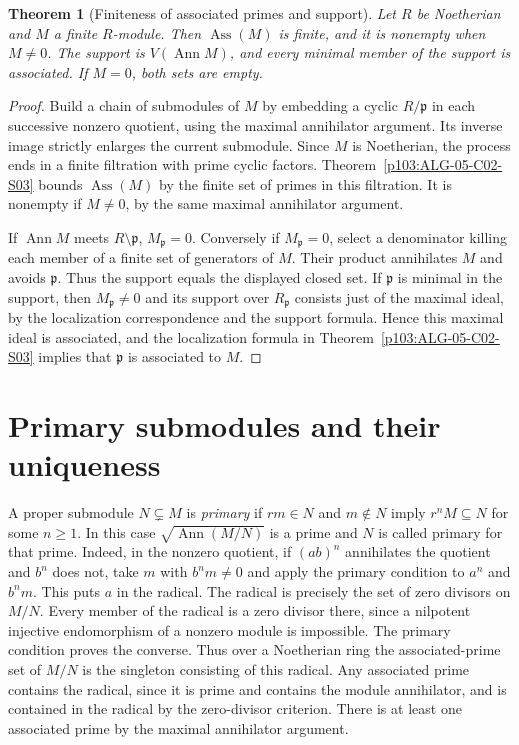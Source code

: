 \documentclass[11pt,oneside,openany]{book}
\newtheorem{theorem}{Theorem}[chapter]
\theoremstyle{definition}
\theoremstyle{remark}
\begin{document}
\begin{theorem}[Finiteness of associated primes and support]\label{p103:ALG-05-C02-R03}
Let \(R\) be Noetherian and \(M\) a finite \(R\)-module. Then \(\operatorname{Ass}(M)\) is finite, and it is nonempty when \(M\ne0\). The support is \(V(\operatorname{Ann}M)\), and every minimal member of the support is associated. If \(M=0\), both sets are empty.
\end{theorem}
\begin{proof}
Build a chain of submodules of \(M\) by embedding a cyclic \(R/\mathfrak p\) in each successive nonzero quotient, using the maximal annihilator argument. Its inverse image strictly enlarges the current submodule. Since \(M\) is Noetherian, the process ends in a finite filtration with prime cyclic factors. Theorem~\ref{p103:ALG-05-C02-S03} bounds \(\operatorname{Ass}(M)\) by the finite set of primes in this filtration. It is nonempty if \(M\ne0\), by the same maximal annihilator argument.

If \(\operatorname{Ann}M\) meets \(R\setminus\mathfrak p\), \(M_{\mathfrak p}=0\). Conversely if \(M_{\mathfrak p}=0\), select a denominator killing each member of a finite set of generators of \(M\). Their product annihilates \(M\) and avoids \(\mathfrak p\). Thus the support equals the displayed closed set. If \(\mathfrak p\) is minimal in the support, then \(M_{\mathfrak p}\ne0\) and its support over \(R_{\mathfrak p}\) consists just of the maximal ideal, by the localization correspondence and the support formula. Hence this maximal ideal is associated, and the localization formula in Theorem~\ref{p103:ALG-05-C02-S03} implies that \(\mathfrak p\) is associated to \(M\).
\end{proof}

\section{Primary submodules and their uniqueness}

A proper submodule \(N\subsetneq M\) is \emph{primary} if \(r m\in N\) and \(m\notin N\) imply \(r^nM\subseteq N\) for some \(n\ge1\). In this case \(\sqrt{\operatorname{Ann}(M/N)}\) is a prime and \(N\) is called primary for that prime. Indeed, in the nonzero quotient, if \((ab)^n\) annihilates the quotient and \(b^n\) does not, take \(m\) with \(b^nm\ne0\) and apply the primary condition to \(a^n\) and \(b^nm\). This puts \(a\) in the radical. The radical is precisely the set of zero divisors on \(M/N\). Every member of the radical is a zero divisor there, since a nilpotent injective endomorphism of a nonzero module is impossible. The primary condition proves the converse. Thus over a Noetherian ring the associated-prime set of \(M/N\) is the singleton consisting of this radical. Any associated prime contains the radical, since it is prime and contains the module annihilator, and is contained in the radical by the zero-divisor criterion. There is at least one associated prime by the maximal annihilator argument.
\end{document}
